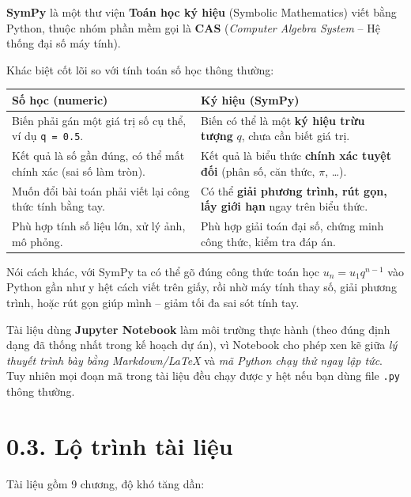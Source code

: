 \documentclass[12pt,a4paper]{report}
\begin{document}
\textbf{SymPy} là một thư viện \textbf{Toán học ký hiệu} (Symbolic
Mathematics) viết bằng Python, thuộc nhóm phần mềm gọi là \textbf{CAS}
(\emph{Computer Algebra System} -- Hệ thống đại số máy tính).

Khác biệt cốt lõi so với tính toán số học thông thường:

\begin{center}
\begin{tabular}{@{}p{}p{}@{}}
\toprule
\textbf{Số học (numeric)} & \textbf{Ký hiệu (SymPy)}\\
\midrule
Biến phải gán một giá trị số cụ thể, ví dụ \texttt{q = 0.5}. &
Biến có thể là một \textbf{ký hiệu trừu tượng} $q$, chưa cần biết giá trị.\\[4pt]
Kết quả là số gần đúng, có thể mất chính xác (sai số làm tròn). &
Kết quả là biểu thức \textbf{chính xác tuyệt đối} (phân số, căn thức, $\pi$, \dots).\\[4pt]
Muốn đổi bài toán phải viết lại công thức tính bằng tay. &
Có thể \textbf{giải phương trình, rút gọn, lấy giới hạn} ngay trên biểu thức.\\[4pt]
Phù hợp tính số liệu lớn, xử lý ảnh, mô phỏng. &
Phù hợp giải toán đại số, chứng minh công thức, kiểm tra đáp án.\\
\bottomrule
\end{tabular}
\end{center}

Nói cách khác, với SymPy ta có thể gõ đúng công thức toán học
$u_n = u_1 q^{n-1}$ vào Python gần như y hệt cách viết trên giấy, rồi
nhờ máy tính thay số, giải phương trình, hoặc rút gọn giúp mình -- giảm
tối đa sai sót tính tay.

\begin{tipbox}
Tài liệu dùng \textbf{Jupyter Notebook} làm môi trường thực hành (theo
đúng định dạng đã thống nhất trong kế hoạch dự án), vì Notebook cho
phép xen kẽ giữa \emph{lý thuyết trình bày bằng Markdown/LaTeX} và
\emph{mã Python chạy thử ngay lập tức}. Tuy nhiên mọi đoạn mã trong tài
liệu đều chạy được y hệt nếu bạn dùng file \texttt{.py} thông thường.
\end{tipbox}

\section*{0.3. Lộ trình tài liệu}

Tài liệu gồm 9 chương, độ khó tăng dần:
\end{document}
